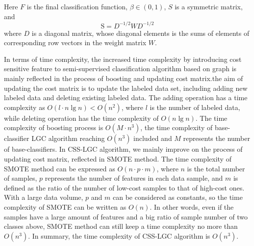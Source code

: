 \documentclass{svjour3}                     %
\begin{document}
Here $F$ is the final classification function, $\beta  \in \left( {0,1} \right)$, $S$ is a symmetric matrix, and
\begin{equation}
  {\text{S}} = {D^{ - 1/2}}W{D^{ - 1/2}}
\end{equation}
where $D$ is a diagonal matrix, whose diagonal elements is the sums of elements of corresponding row vectors in the weight matrix $W$.

In terms of time complexity, the increased time complexity by introducing cost sensitive feature to semi-supervised classification algorithm based on graph is mainly reflected in the process of boosting and updating cost matrix.the aim of updating the cost matrix is to update the labeled data set, including adding new labeled data and deleting existing labeled data. The adding operation has a time complexity as $O(l \cdot n\lg n) < O({n^2}) $, where $l$ is the number of labeled data, while deleting operation has the time complexity of $O(n\lg n)$. The time complexity of boosting process is $O(M \cdot {n^3})$, the time complexity of base-classifier LGC algorithm reaching $O({n^3})$ included and $M$ represents the number of base-classifiers. In CSS-LGC algorithm, we mainly improve on the process of updating cost matrix, reflected in SMOTE method. The time complexity of SMOTE method can be expressed as $O(n \cdot p \cdot m)$, where $n$ is the total number of samples, $p$ represents the number of features in each data sample, and $m$ is defined as the ratio of the number of low-cost samples to that of high-cost ones. With a large data volume, $p$ and $m$ can be considered as constants, so the time complexity of SMOTE can be written as $O(n)$. In other words, even if the samples have a large amount of features and a big ratio of sample number of two classes above, SMOTE method can still keep a time complexity no more than $O({n^3})$. In summary, the time complexity of CSS-LGC algorithm is $O({n^3})$.
\end{document}
